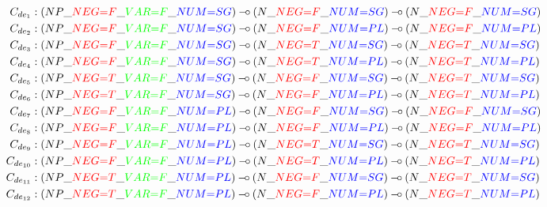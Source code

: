 {\centering
{\small
\begin{align*}
C_{de_1} &: (NP\_\textcolor{red}{NEG{=}F}\_\textcolor{green}{VAR{=}F}\_\textcolor{blue}{NUM{=}SG}) \limp (N\_\textcolor{red}{NEG{=}F}\_\textcolor{blue}{NUM{=}SG}) \limp
(N\_\textcolor{red}{NEG{=}F}\_\textcolor{blue}{NUM{=}SG}) \\
C_{de_2} &: (NP\_\textcolor{red}{NEG{=}F}\_\textcolor{green}{VAR{=}F}\_\textcolor{blue}{NUM{=}SG}) \limp (N\_\textcolor{red}{NEG{=}F}\_\textcolor{blue}{NUM{=}PL}) \limp
(N\_\textcolor{red}{NEG{=}F}\_\textcolor{blue}{NUM{=}PL}) \\
C_{de_3} &: (NP\_\textcolor{red}{NEG{=}F}\_\textcolor{green}{VAR{=}F}\_\textcolor{blue}{NUM{=}SG}) \limp (N\_\textcolor{red}{NEG{=}T}\_\textcolor{blue}{NUM{=}SG}) \limp
(N\_\textcolor{red}{NEG{=}T}\_\textcolor{blue}{NUM{=}SG}) \\
C_{de_4} &: (NP\_\textcolor{red}{NEG{=}F}\_\textcolor{green}{VAR{=}F}\_\textcolor{blue}{NUM{=}SG}) \limp (N\_\textcolor{red}{NEG{=}T}\_\textcolor{blue}{NUM{=}PL}) \limp
(N\_\textcolor{red}{NEG{=}T}\_\textcolor{blue}{NUM{=}PL}) \\
C_{de_5} &: (NP\_\textcolor{red}{NEG{=}T}\_\textcolor{green}{VAR{=}F}\_\textcolor{blue}{NUM{=}SG}) \limp (N\_\textcolor{red}{NEG{=}F}\_\textcolor{blue}{NUM{=}SG}) \limp
(N\_\textcolor{red}{NEG{=}T}\_\textcolor{blue}{NUM{=}SG}) \\
C_{de_6} &: (NP\_\textcolor{red}{NEG{=}T}\_\textcolor{green}{VAR{=}F}\_\textcolor{blue}{NUM{=}SG}) \limp (N\_\textcolor{red}{NEG{=}F}\_\textcolor{blue}{NUM{=}PL}) \limp
(N\_\textcolor{red}{NEG{=}T}\_\textcolor{blue}{NUM{=}PL}) \\
C_{de_7} &: (NP\_\textcolor{red}{NEG{=}F}\_\textcolor{green}{VAR{=}F}\_\textcolor{blue}{NUM{=}PL}) \limp (N\_\textcolor{red}{NEG{=}F}\_\textcolor{blue}{NUM{=}SG}) \limp
(N\_\textcolor{red}{NEG{=}F}\_\textcolor{blue}{NUM{=}SG}) \\
C_{de_8} &: (NP\_\textcolor{red}{NEG{=}F}\_\textcolor{green}{VAR{=}F}\_\textcolor{blue}{NUM{=}PL}) \limp (N\_\textcolor{red}{NEG{=}F}\_\textcolor{blue}{NUM{=}PL}) \limp
(N\_\textcolor{red}{NEG{=}F}\_\textcolor{blue}{NUM{=}PL}) \\
C_{de_9} &: (NP\_\textcolor{red}{NEG{=}F}\_\textcolor{green}{VAR{=}F}\_\textcolor{blue}{NUM{=}PL}) \limp (N\_\textcolor{red}{NEG{=}T}\_\textcolor{blue}{NUM{=}SG}) \limp
(N\_\textcolor{red}{NEG{=}T}\_\textcolor{blue}{NUM{=}SG}) \\
C_{de_{10}} &: (NP\_\textcolor{red}{NEG{=}F}\_\textcolor{green}{VAR{=}F}\_\textcolor{blue}{NUM{=}PL}) \limp (N\_\textcolor{red}{NEG{=}T}\_\textcolor{blue}{NUM{=}PL}) \limp
(N\_\textcolor{red}{NEG{=}T}\_\textcolor{blue}{NUM{=}PL}) \\
C_{de_{11}} &: (NP\_\textcolor{red}{NEG{=}T}\_\textcolor{green}{VAR{=}F}\_\textcolor{blue}{NUM{=}PL}) \limp (N\_\textcolor{red}{NEG{=}F}\_\textcolor{blue}{NUM{=}SG}) \limp (N\_\textcolor{red}{NEG{=}T}\_\textcolor{blue}{NUM{=}SG}) \\
C_{de_{12}} &: (NP\_\textcolor{red}{NEG{=}T}\_\textcolor{green}{VAR{=}F}\_\textcolor{blue}{NUM{=}PL}) \limp (N\_\textcolor{red}{NEG{=}F}\_\textcolor{blue}{NUM{=}PL}) \limp (N\_\textcolor{red}{NEG{=}T}\_\textcolor{blue}{NUM{=}PL})
\end{align*}
}
}

